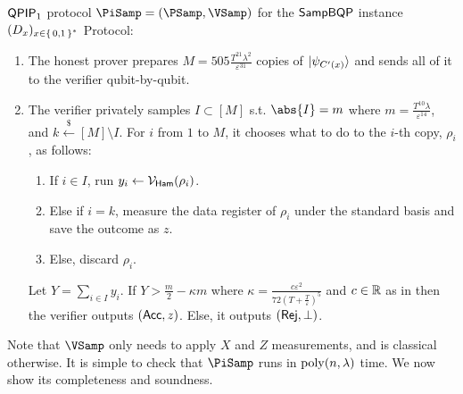 \begin{protocol}{$\operatorname{\mathsf{QPIP}}_1$ protocol $\PiSamp=(\PSamp, \VSamp)$ for the $\operatorname{\mathsf{SampBQP}}$ instance $(D_x)_{x\in\set{0, 1}^*}$}
	Protocol:
	\begin{enumerate}
		\item\label{step:qpip1-state-gen} The honest prover prepares $M=505\frac{T^{21}\lambda^2}{\varepsilon^{31}}$  copies of $\ket{\psi_{C'(x)}}$ and sends all of it to the verifier qubit-by-qubit.
		\item\label{step:qpip1-verify} The verifier privately samples $I\subset[M]$ s.t. $\abs{I}=m$ where $m=\frac{T^{10}\lambda}{\varepsilon^{14}}$, and $k\xleftarrow{\$}[M]\setminus I$.  
			For $i$ from $1$ to $M$, it chooses what to do to the $i$-th copy, $\rho_i$, as follows:
		\begin{enumerate}
			\item If $i\in I$, run $y_i\leftarrow\mathcal{V}_{\mathsf{Ham}}(\rho_i)$.
			\item Else if $i=k$, measure the data register  of $\rho_i$ under the standard basis and save the outcome as $z$.
			\item Else, discard $\rho_i$.
		\end{enumerate}
			Let $Y=\sum_{i\in I} y_i$. If $Y>\frac{m}{2}-\kappa m$ where $\kappa=\frac{c\varepsilon^2}{72\left(T+\frac{T}{\varepsilon}\right)^5}$ and $c\in\mathbb{R}$ as in  then the verifier outputs $(\mathsf{Acc}, z)$.
			Else, it outputs $(\mathsf{Rej}, \bot)$.
	\end{enumerate}
\end{protocol}

Note that $\VSamp$ only needs to apply $X$ and $Z$ measurements, and is classical otherwise.
It is simple to check that $\PiSamp$ runs in $\operatorname*{\operatorname{poly}}(n, \lambda)$ time. 
We now show its completeness and soundness.
  
